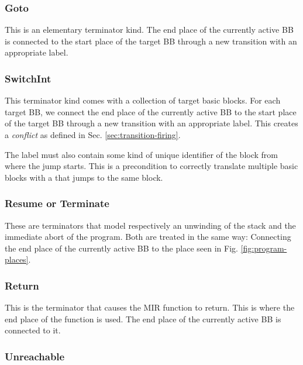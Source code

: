 \subsubsection{Goto}

This is an elementary terminator kind.
The end place of the currently active \acrshort{BB} is connected
to the start place of the target \acrshort{BB}
through a new transition with an appropriate label.

\subsubsection{SwitchInt}

This terminator kind comes with a collection of target basic blocks.
For each target \acrshort{BB},
we connect the end place of the currently active \acrshort{BB}
to the start place of the target \acrshort{BB}
through a new transition with an appropriate label.
This creates a \emph{conflict} as defined in Sec. \ref{sec:transition-firing}.

The label must also contain some kind of unique identifier of the block from where the
jump starts.
This is a precondition to correctly translate multiple basic blocks with a 
that jumps to the same block.

\subsubsection{Resume or Terminate}

These are terminators that model respectively an unwinding of the stack
and the immediate abort of the program.
Both are treated in the same way:
Connecting the end place of the currently active \acrshort{BB}
to the  place seen in Fig. \ref{fig:program-places}.

\subsubsection{Return}

This is the terminator that causes the \acrshort{MIR} function to return.
This is where the end place of the function is used.
The end place of the currently active \acrshort{BB} is connected to it.

\subsubsection{Unreachable}

